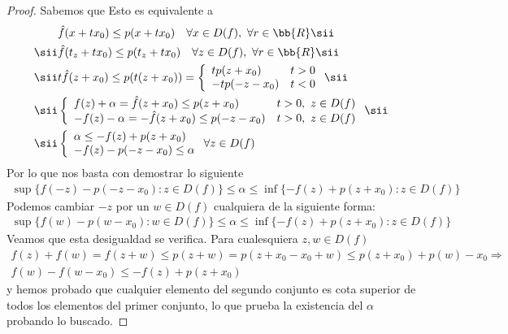 \begin{teo}
\begin{proof}
        Sabemos que Esto es equivalente a
        \begin{align*}
            &\hat{f}(x+tx_0)\leq p(x+tx_0) \ \ \ \forall x \in D(f),\ \forall r \in \bb{R} \sii\\ 
            \sii &\hat{f}(t_z+tx_0)\leq p(t_z+tx_0) \ \ \ \forall z \in D(f),\ \forall r \in \bb{R} \sii\\
            \sii &t \hat{f}(z+x_0) \leq p(t(z+x_0)) = 
            \left\{
                \begin{array}{l c}
                    tp(z+x_0) & t>0\\
                    -tp(-z-x_0) & t<0
                \end{array}
            \right. \sii\\
            \sii & \left\{
                \begin{array}{l c}
                    f(z) +\alpha = \hat{f}(z+x_0)\leq p(z+x_0) & t>0,\ z\in D(f)\\
                    -f(z) -\alpha = -\hat{f}(z+x_0)\leq p(-z-x_0) & t>0,\ z\in D(f)\\
                \end{array}
            \right. \sii\\
            \sii & \left\{
                \begin{array}{l}
                    \alpha \leq -f(z) + p(z+x_0)\\
                    -f(z)-p(-z-x_0) \leq \alpha
                \end{array}
            \right. \forall z \in D(f)
        \end{align*}
        Por lo que nos basta con demostrar lo siguiente
        \begin{gather*}
            \sup\{f(-z)-p(-z-x_0) : z\in D(f)\} \leq \alpha \leq \inf\{-f(z) + p(z+x_0):z\in D(f)\}
        \end{gather*}
        Podemos cambiar $-z$ por un $w\in D(f)$ cualquiera de la siguiente forma:
        \begin{gather*}
            \sup\{f(w)-p(w-x_0) : w\in D(f)\} \leq \alpha \leq \inf\{-f(z) + p(z+x_0):z\in D(f)\}
        \end{gather*}
        Veamos que esta desigualdad se verifica. Para cualesquiera $z,w\in D(f)$
        \begin{gather*}
            f(z) + f(w) = f(z+w) \leq p(z+w) = p(z+x_0-x_0+w) \leq p(z+x_0) + p(w)-x_0 \Rightarrow \\
            f(w) - f(w-x_0) \leq -f(z)+p(z+x_0)
        \end{gather*}
        y hemos probado que cualquier elemento del segundo conjunto es cota superior de todos los elementos del primer conjunto, lo que prueba la existencia del $\alpha$ probando lo buscado.
    \end{proof}
\end{teo}

